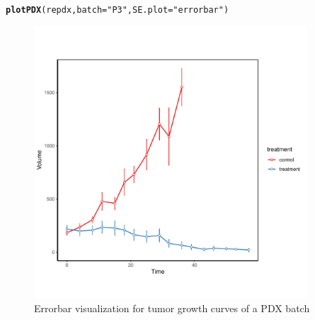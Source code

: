 \documentclass{article}\usepackage[]{graphicx}\usepackage[]{xcolor}
\makeatletter
\newcommand{\hlstr}[1]{\textcolor[rgb]{0.192,0.494,0.8}{#1}}%
\newcommand{\hlstd}[1]{\textcolor[rgb]{0.345,0.345,0.345}{#1}}%
\newcommand{\hlkwc}[1]{\textcolor[rgb]{0.333,0.667,0.333}{#1}}%
\newcommand{\hlkwd}[1]{\textcolor[rgb]{0.737,0.353,0.396}{\textbf{#1}}}%
\newenvironment{kframe}{%
 \def\at@end@of@kframe{}%
 \ifinner\ifhmode%
  \def\at@end@of@kframe{\end{minipage}}%
  \begin{minipage}{\columnwidth}%
 \fi\fi%
 \def\FrameCommand##1{\hskip\@totalleftmargin \hskip-\fboxsep
 \colorbox{shadecolor}{##1}\hskip-\fboxsep
     \hskip-\linewidth \hskip-\@totalleftmargin \hskip\columnwidth}%
 \MakeFramed {\advance\hsize-\width
   \@totalleftmargin\z@ \linewidth\hsize
   \@setminipage}}%
 {\par\unskip\endMakeFramed%
 \at@end@of@kframe}
\newenvironment{knitrout}{}{} %
\makeatother
\begin{document}
\begin{knitrout}
\color{fgcolor}\begin{kframe}
\begin{alltt}
\hlkwd{plotPDX}\hlstd{(repdx,} \hlkwc{batch} \hlstd{=} \hlstr{"P3"}\hlstd{,} \hlkwc{SE.plot} \hlstd{=} \hlstr{"errorbar"}\hlstd{)}
\end{alltt}
\end{kframe}\begin{figure}
\includegraphics[width=4in]{figure/repplot2-1} \caption[Errorbar visualization for tumor growth curves of a PDX batch]{Errorbar visualization for tumor growth curves of a PDX batch}\label{fig:repplot2}
\end{figure}

\end{knitrout}
\end{document}

